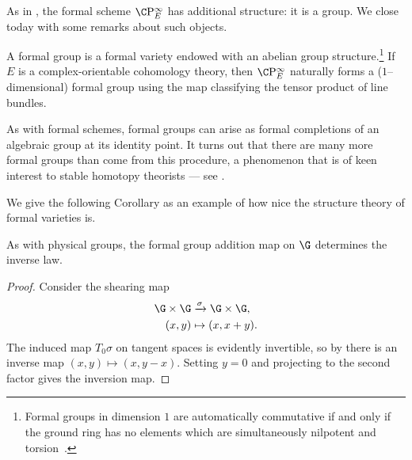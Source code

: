 As in , the formal scheme $\CP^\infty_E$ has additional structure: it is a group.  We close today with some remarks about such objects.

\begin{definition}\label{DefnFormalGps}
A formal group is a formal variety endowed with an abelian group structure.\footnote{Formal groups in dimension $1$ are automatically commutative if and only if the ground ring has no elements which are simultaneously nilpotent and torsion~\cite[Theorem I.6.1]{Hazewinkel}.}  If $E$ is a complex-orientable cohomology theory, then $\CP^\infty_E$ naturally forms a ($1$--dimensional) formal group using the map classifying the tensor product of line bundles.
\end{definition}

\begin{remark}
As with formal schemes, formal groups can arise as formal completions of an algebraic group at its identity point.  It turns out that there are many more formal groups than come from this procedure, a phenomenon that is of keen interest to stable homotopy theorists --- see .
\end{remark}

We give the following Corollary as an example of how nice the structure theory of formal varieties is.

\begin{corollary}
As with physical groups, the formal group addition map on $\G$ determines the inverse law.
\end{corollary}
\begin{proof}
Consider the shearing map
\begin{align*}
\G \times \G & \xrightarrow{\sigma} \G \times \G, \\
(x, y) & \mapsto (x, x + y).
\end{align*}
The induced map $T_0 \sigma$ on tangent spaces is evidently invertible, so by  there is an inverse map $(x, y) \mapsto (x, y - x)$.  Setting $y = 0$ and projecting to the second factor gives the inversion map.
\end{proof}



